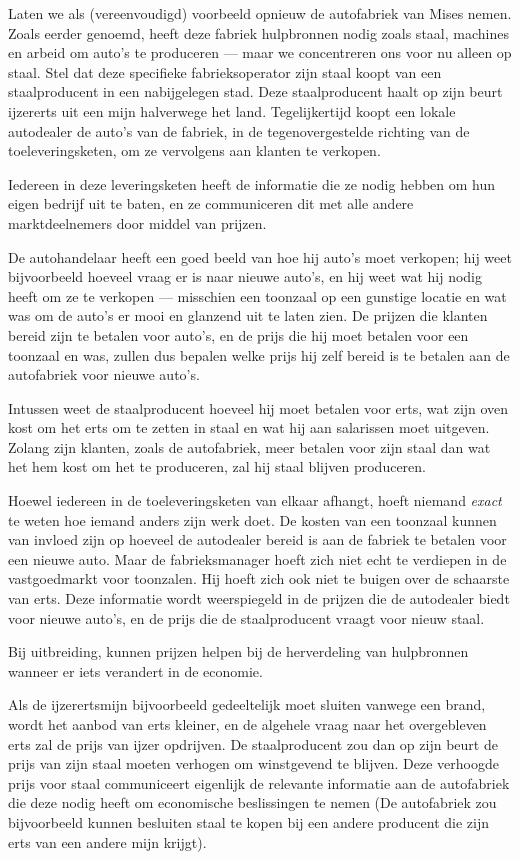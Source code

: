 \documentclass[smalldemyvopaper,11pt,twoside,onecolumn,openright,extrafontsizes,hidelinks]{memoir}
\begin{document}
Laten we als (vereenvoudigd) voorbeeld opnieuw de autofabriek van Mises
nemen. Zoals eerder genoemd, heeft deze fabriek hulpbronnen nodig zoals
staal, machines en arbeid om auto's te produceren --- maar we
concentreren ons voor nu alleen op staal. Stel dat deze specifieke
fabrieksoperator zijn staal koopt van een staalproducent in een
nabijgelegen stad. Deze staalproducent haalt op zijn beurt ijzererts uit
een mijn halverwege het land. Tegelijkertijd koopt een lokale autodealer
de auto's van de fabriek, in de tegenovergestelde richting van de
toeleveringsketen, om ze vervolgens aan klanten te verkopen.

Iedereen in deze leveringsketen heeft de informatie die ze nodig hebben
om hun eigen bedrijf uit te baten, en ze communiceren dit met alle
andere marktdeelnemers door middel van prijzen.

De autohandelaar heeft een goed beeld van hoe hij auto's moet verkopen;
hij weet bijvoorbeeld hoeveel vraag er is naar nieuwe auto's, en hij
weet wat hij nodig heeft om ze te verkopen --- misschien een toonzaal op
een gunstige locatie en wat was om de auto's er mooi en glanzend uit te
laten zien. De prijzen die klanten bereid zijn te betalen voor auto's,
en de prijs die hij moet betalen voor een toonzaal en was, zullen dus
bepalen welke prijs hij zelf bereid is te betalen aan de autofabriek
voor nieuwe auto's.

Intussen weet de staalproducent hoeveel hij moet betalen voor erts, wat
zijn oven kost om het erts om te zetten in staal en wat hij aan
salarissen moet uitgeven. Zolang zijn klanten, zoals de autofabriek,
meer betalen voor zijn staal dan wat het hem kost om het te produceren,
zal hij staal blijven produceren.

Hoewel iedereen in de toeleveringsketen van elkaar afhangt, hoeft
niemand \emph{exact} te weten hoe iemand anders zijn werk doet. De
kosten van een toonzaal kunnen van invloed zijn op hoeveel de autodealer
bereid is aan de fabriek te betalen voor een nieuwe auto. Maar de
fabrieksmanager hoeft zich niet echt te verdiepen in de vastgoedmarkt
voor toonzalen. Hij hoeft zich ook niet te buigen over de schaarste van
erts. Deze informatie wordt weerspiegeld in de prijzen die de autodealer
biedt voor nieuwe auto's, en de prijs die de staalproducent vraagt voor
nieuw staal.

Bij uitbreiding, kunnen prijzen helpen bij de herverdeling van
hulpbronnen wanneer er iets verandert in de economie.

Als de ijzerertsmijn bijvoorbeeld gedeeltelijk moet sluiten vanwege een
brand, wordt het aanbod van erts kleiner, en de algehele vraag naar het
overgebleven erts zal de prijs van ijzer opdrijven. De staalproducent
zou dan op zijn beurt de prijs van zijn staal moeten verhogen om
winstgevend te blijven. Deze verhoogde prijs voor staal communiceert
eigenlijk de relevante informatie aan de autofabriek die deze nodig
heeft om economische beslissingen te nemen (De autofabriek zou
bijvoorbeeld kunnen besluiten staal te kopen bij een andere producent
die zijn erts van een andere mijn krijgt).
\end{document}
